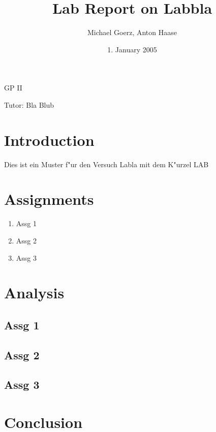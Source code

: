 \documentclass[a4paper,10pt]{article}
\title{Lab Report on Labbla}
\author{Michael Goerz, Anton Haase}
\date{1. January 2005}
\begin{document}
\maketitle
\noindent GP II

\noindent Tutor: Bla Blub

\section{Introduction}
Dies ist ein Muster f"ur den Versuch Labla mit dem K"urzel LAB


\section{Assignments}
\begin{enumerate}
\item Assg 1
\item Assg 2
\item Assg 3
\end{enumerate}

\clearpage


\section{Analysis}

\subsection{Assg 1}

\subsection{Assg 2}

\subsection{Assg 3}




\section{Conclusion}
\end{document}
